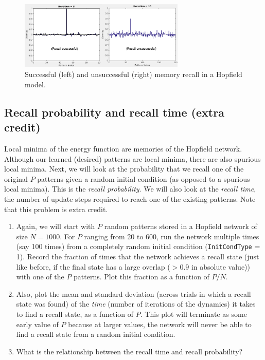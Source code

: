 \documentclass[letterpaper,11pt]{article}
\begin{document}
\begin{figure}[h!]
  \begin{center}
    \includegraphics[width=0.7\textwidth]{recall.png}
    \caption{Successful (left) and unsuccessful (right) memory recall in a Hopfield model.}
    \label{fig:recall}
  \end{center}
\end{figure}

\subsection{Recall probability and recall time (extra credit)}
Local minima of the energy function are memories of the Hopfield network.
Although our learned (desired) patterns are local minima, there are also spurious local minima.
Next, we will look at the probability that we recall one of the original $P$ patterns given a random initial condition (as opposed to a spurious local minima).
This is the \textit{recall probability}.
We will also look at the \textit{recall time}, the number of update steps required to reach one of the existing patterns.
Note that this problem is extra credit.

\begin{enumerate}
  \item Again, we will start with $P$ random patterns stored in a Hopfield network of size $N=1000$. For $P$ ranging from 20 to 600, run the network multiple times (say 100 times) from a completely random initial condition (\texttt{InitCondType} = 1). Record the fraction of times that the network achieves a recall state (just like before, if the final state has a large overlap ($> 0.9$ in absolute value)) with one of the $P$ patterns. Plot this fraction as a function of $P/N$.
  \item Also, plot the mean and standard deviation (across trials in which a recall state was found) of the \textit{time} (number of iterations of the dynamics) it takes to find a recall state, as a function of $P$. This plot will terminate as some early value of $P$ because at larger values, the network will never be able to find a recall state from a random initial condition.
  \item What is the relationship between the recall time and recall probability?
\end{enumerate}
\end{document}
